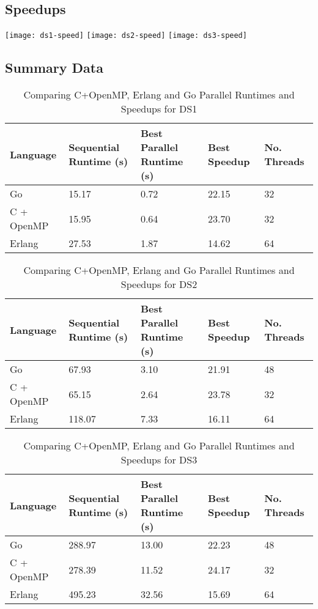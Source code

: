 \documentclass[11pt,a4paper,titlepage]{article}
\begin{document}
\clearpage

\subsection{Speedups}

\texttt{[image: ds1-speed]}
\texttt{[image: ds2-speed]}
\texttt{[image: ds3-speed]}

\subsection{Summary Data}

\begin{table}[!h]
	\centering
	\begin{tabulary}{\textwidth}{|L|L|L|L|L|}
		\hline
		Language & Sequential Runtime (s) & Best Parallel Runtime (s) & Best Speedup & No. Threads \\ \hline
		Go & 15.17 & 0.72 & 22.15 & 32 \\ \hline
		C + OpenMP & 15.95 & 0.64 & 23.70 & 32 \\ \hline
		Erlang & 27.53 & 1.87 & 14.62 & 64 \\ \hline
	\end{tabulary}
	\caption{Comparing C+OpenMP, Erlang and Go Parallel Runtimes and Speedups for DS1}
\end{table}

\begin{table}[!h]
	\centering
	\begin{tabulary}{\textwidth}{|L|L|L|L|L|}
		\hline
		Language & Sequential Runtime (s) & Best Parallel Runtime (s) & Best Speedup & No. Threads \\ \hline
		Go & 67.93 & 3.10 & 21.91 & 48 \\ \hline
		C + OpenMP & 65.15 & 2.64 & 23.78 & 32 \\ \hline
		Erlang & 118.07 & 7.33 & 16.11 & 64 \\ \hline
	\end{tabulary}
	\caption{Comparing C+OpenMP, Erlang and Go Parallel Runtimes and Speedups for DS2}
\end{table}

\begin{table}[!h]
	\centering
	\begin{tabulary}{\textwidth}{|L|L|L|L|L|}
		\hline
		Language & Sequential Runtime (s) & Best Parallel Runtime (s) & Best Speedup & No. Threads \\ \hline
		Go & 288.97 & 13.00 & 22.23 & 48 \\ \hline
		C + OpenMP & 278.39 & 11.52 & 24.17 & 32 \\ \hline
		Erlang & 495.23 & 32.56 & 15.69 & 64 \\ \hline
	\end{tabulary}
	\caption{Comparing C+OpenMP, Erlang and Go Parallel Runtimes and Speedups for DS3}
\end{table}
\end{document}
